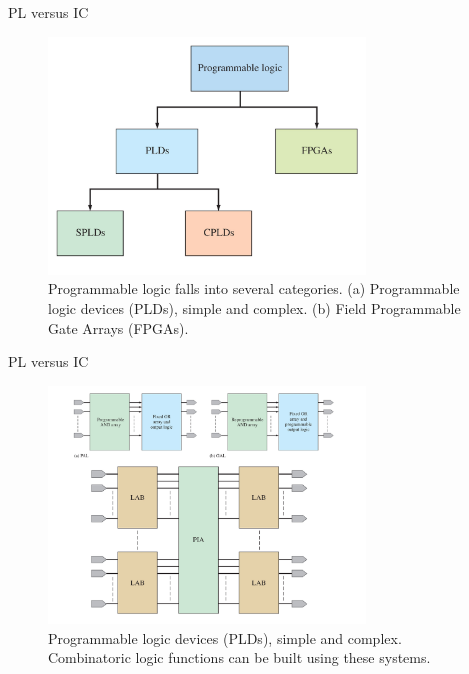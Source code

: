 \documentclass{beamer}
\begin{document}
\begin{frame}{PL versus IC}
\small
\begin{figure}
\includegraphics[width=0.75\textwidth]{PL.pdf}
\caption{\label{fig:PL1} Programmable logic falls into several categories. (a) Programmable logic devices (PLDs), simple and complex.  (b) Field Programmable Gate Arrays (FPGAs). }
\end{figure}
\end{frame}

\begin{frame}{PL versus IC}
\small
\begin{figure}
\includegraphics[width=0.75\textwidth]{PL2.pdf}
\caption{\label{fig:PL2} Programmable logic devices (PLDs), simple and complex.  Combinatoric logic functions can be built using these systems.}
\end{figure}
\end{frame}
\end{document}
